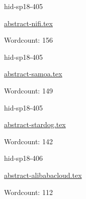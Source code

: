 

\begin{IU}

hid-sp18-405

\href{https://github.com/cloudmesh-community/hid-sp18-405/blob/master//technology/abstract-nifi.tex}{abstract-nifi.tex}

 

Wordcount: 156

\end{IU}



\begin{IU}

hid-sp18-405

\href{https://github.com/cloudmesh-community/hid-sp18-405/blob/master//technology/abstract-samoa.tex}{abstract-samoa.tex}

 

Wordcount: 149

\end{IU}



\begin{IU}

hid-sp18-405

\href{https://github.com/cloudmesh-community/hid-sp18-405/blob/master//technology/abstract-stardog.tex}{abstract-stardog.tex}

 

Wordcount: 142

\end{IU}



\begin{IU}

hid-sp18-406

\href{https://github.com/cloudmesh-community/hid-sp18-406/blob/master//technology/abstract-alibabacloud.tex}{abstract-alibabacloud.tex}

 

Wordcount: 112

\end{IU}



